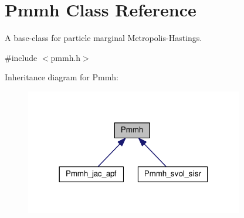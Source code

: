 \hypertarget{classPmmh}{}\section{Pmmh Class Reference}
\label{classPmmh}


A base-\/class for particle marginal Metropolis-\/\+Hastings.  




{\ttfamily \#include $<$pmmh.\+h$>$}



Inheritance diagram for Pmmh\+:
\nopagebreak
\begin{figure}[H]
\begin{center}
\leavevmode
\includegraphics[width=270pt]{classPmmh__inherit__graph}
\end{center}
\end{figure}
